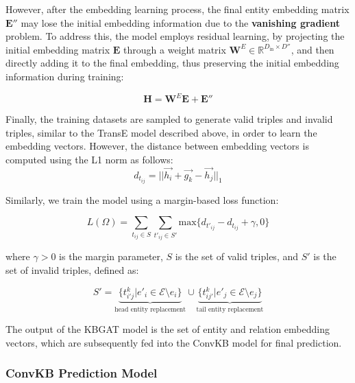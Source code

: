 However, after the embedding learning process, the final entity embedding matrix $\mathbf{E}''$ may lose the initial embedding information due to the \textbf{vanishing gradient} problem. To address this, the model employs residual learning, by projecting the initial embedding matrix $\mathbf{E}$ through a weight matrix $\mathbf{W}^E \in \mathbb{R}^{D_{\text{in}} \times D''}$, and then directly adding it to the final embedding, thus preserving the initial embedding information during training:

\begin{equation}
	\label{eq:reInitEmbedding}
	\mathbf{H} = \mathbf{W}^E \mathbf{E} + \mathbf{E''}
\end{equation}

Finally, the training datasets are sampled to generate valid triples and invalid triples, similar to the TransE model described above, in order to learn the embedding vectors. However, the distance between embedding vectors is computed using the L1 norm as follows:
\[
d_{t_{ij}} = \big|\big|\vec{h_i}+ \vec{g_k}-\vec{h_j}\big|\big|_1
\]

Similarly, we train the model using a margin-based loss function:

\begin{equation}
	L(\Omega)=\sum_{t_{ij} \in S} \sum_{t'_{ij} \in S'} \text{max}\{d_{t'_{ij}} - d_{t_{ij}} + \gamma , 0 \}
\end{equation}

where $\gamma > 0$ is the margin parameter, $S$ is the set of valid triples, and $S'$ is the set of invalid triples, defined as:

\begin{equation}
	{S'} ={\underbrace{\{ t^k_{i'j} | e'_i \in \mathcal{E}\setminus e_i\}}_{\text{head entity replacement}} \cup \underbrace{\{ t^k_{ij'} | e'_j \in \mathcal{E}\setminus e_j\}}_{\text{tail entity replacement}}}
\end{equation}

The output of the KBGAT model is the set of entity and relation embedding vectors, which are subsequently fed into the ConvKB model for final prediction.




\subsubsection{ConvKB Prediction Model}
\label{sec:predictionConvKB}

